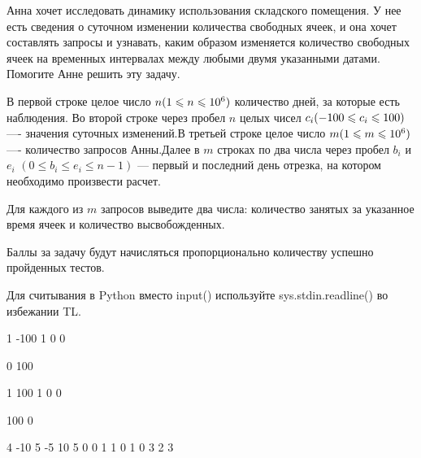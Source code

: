 
Анна хочет исследовать динамику использования складского помещения. У нее есть сведения о суточном изменении количества свободных ячеек, и она хочет составлять запросы и узнавать, каким образом изменяется количество свободных ячеек на временных интервалах между любыми двумя указанными датами. Помогите Анне решить эту задачу.


В первой строке целое число $n\space (1\leq n \leq 10^6)$ количество дней, за которые есть наблюдения. Во второй строке через пробел $n$ целых чисел $c_i\space (-100\leq c_i \leq 100)$ —- значения суточных изменений.В третьей строке целое число $m\space (1\leq m \leq 10^6)$  —- количество запросов Анны.Далее в $m$  строках по два числа через пробел $b_i$  и $e_i$  $(0\leq b_i \leq e_i \leq n-1)$  — первый и последний день отрезка, на котором необходимо произвести расчет.

\outputfmtSection

Для каждого из $m$ запросов выведите два числа: количество занятых за указанное время ячеек и количество высвобожденных.

\markSection

Баллы за задачу будут начисляться пропорционально количеству успешно пройденных тестов.

\explanationSection

Для считывания в Python вместо input() используйте sys.stdin.readline() во избежании TL.


\begin{myverbbox}[\small]{\vinput}
    1
    -100
    1
    0 0
\end{myverbbox}

\begin{myverbbox}[\small]{\voutput}
    0 100
\end{myverbbox}


\begin{myverbbox}[\small]{\vinput}
    1
    100
    1
    0 0
\end{myverbbox}

\begin{myverbbox}[\small]{\voutput}
    100 0
\end{myverbbox}


\begin{myverbbox}[\small]{\vinput}
    4
    -10 5 -5 10
    5
    0 0
    1 1
    0 1
    0 3
    2 3
\end{myverbbox}

